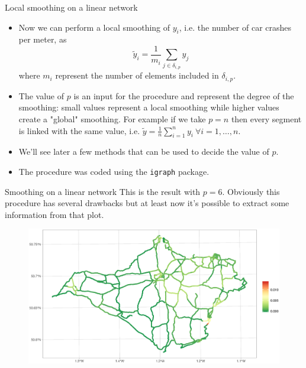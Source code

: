 \documentclass[c,10pt,pdftex]{beamer}
\begin{document}
\begin{frame}{Local smoothing on a linear network}
\vspace{-0.5cm}
\begin{itemize}
	\setlength\itemsep{1em}
	\item Now we can perform a local smoothing of $y_i$, i.e. the number of car crashes per meter, as
	\[
	\tilde{y}_i = \frac{1}{m_i}\sum_{j \in \delta_{i, p}} y_{j} 
	\]
	where $m_i$ represent the number of elements included in $\delta_{i, p}$. 
	
	\item The value of $p$ is an input for the procedure and represent the degree of the smoothing: small values represent a local smoothing while higher values create a "global" smoothing. For example if we take $p = n$ then every segment is linked with the same value, i.e. $\tilde{y} = \frac{1}{n}\sum_{i=1}^{n}y_{i} \ \forall i = 1, \dots, n$. 
	
	\item We'll see later a few methods that can be used to decide the value of $p$. 
	\item The procedure was coded using the \texttt{igraph} package.
\end{itemize}
\end{frame}

\begin{frame}{Smoothing on a linear network}
\vspace{-0.25cm}
This is the result with $p = 6$. Obviously this procedure has several drawbacks but at least now it's possible to extract some information from that plot. 
\begin{figure}
	\centering
	\includegraphics[width=\linewidth]{images/car_crashes_per_meter_smooth6}
\end{figure}
\end{frame}
\end{document}
